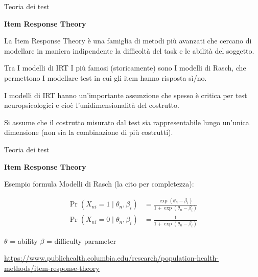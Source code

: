 \documentclass[
  ignorenonframetext,
]{beamer}
\begin{document}
\begin{frame}{Teoria dei test}
\label{teoria-dei-test-4}
\begin{center}
  \textbf{Item Response Theory}
\end{center}

La Item Response Theory è una famiglia di metodi più avanzati che
cercano di modellare in maniera indipendente la difficoltà del task e le
abilità del soggetto.

Tra I modelli di IRT I più famosi (storicamente) sono I modelli di
Rasch, che permettono I modellare test in cui gli item hanno risposta
sì/no. \pause

I modelli di IRT hanno un'importante assunzione che spesso è critica per
test neuropsicologici e cioè l'unidimensionalità del costrutto. \pause

Si assume che il costrutto misurato dal test sia rappresentabile lungo
un'unica dimensione (non sia la combinazione di più costrutti).
\end{frame}

\begin{frame}{Teoria dei test}
\label{teoria-dei-test-5}
\begin{center}
  \textbf{Item Response Theory}
\end{center}

Esempio formula Modelli di Rasch (la cito per completezza): \vspace{2em}

\small
\begin{align}
  \Pr(X_{ni}=1 \mid \theta_n, \beta_i)
  &= \frac{\exp(\theta_n - \beta_i)}{1 + \exp(\theta_n - \beta_i)}
  \label{eq:rasch_prob}
  \\
  \Pr(X_{ni}=0 \mid \theta_n, \beta_i) &= \frac{1}{1 + \exp(\theta_n - \beta_i)}
  \label{eq:rasch_prob0}
\end{align}

$\theta$ = ability
$\beta$ = difficulty parameter

\vspace{2em}

\href{https://www.publichealth.columbia.edu/research/population-health-methods/item-response-theory}{\ul{https://www.publichealth.columbia.edu/research/population-health-methods/item-response-theory}}
\end{frame}
\end{document}
